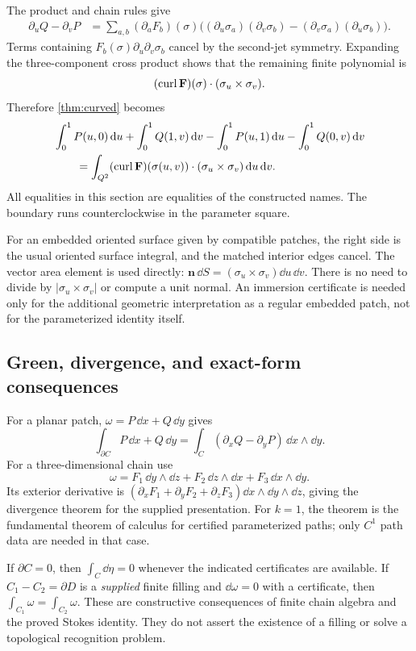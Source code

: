 The product and chain rules give
\begin{align*}
 \partial_uQ-\partial_vP
 &=\sum_{a,b}(\partial_aF_b)(\sigma)
       \bigl((\partial_u\sigma_a)(\partial_v\sigma_b)
             -(\partial_v\sigma_a)(\partial_u\sigma_b)\bigr).
\end{align*}
Terms containing $F_b(\sigma)\partial_u\partial_v\sigma_b$ cancel
by the second-jet symmetry. Expanding the three-component cross
product shows that the remaining finite polynomial is
\[
 (\operatorname{curl}\mathbf F)(\sigma)\cdot(\sigma_u\times\sigma_v).
\]
Therefore \cref{thm:curved} becomes
\begin{align}
 &\int_0^1P(u,0)\,\mathrm d u+\int_0^1Q(1,v)\,\mathrm d v
       -\int_0^1P(u,1)\,\mathrm d u-\int_0^1Q(0,v)\,\mathrm d v\notag\\
 &\hspace{2em}=
 \int_{Q^2}(\operatorname{curl}\mathbf F)(\sigma(u,v))
                       \cdot(\sigma_u\times\sigma_v)\,\mathrm d u\,\mathrm d v .
 \label{eq:kelvin-explicit}
\end{align}
All equalities in this section are equalities of the constructed names.
The boundary runs counterclockwise in the parameter square.

For an embedded oriented surface given by compatible patches, the right
side is the usual oriented surface integral, and the matched interior
edges cancel. The vector area element is used directly:
$\mathbf n\,\dd S=(\sigma_u\times\sigma_v)\dd u\,\dd v$.
There is no need to divide by $|\sigma_u\times\sigma_v|$ or compute a unit
normal. An immersion certificate is needed only for the additional
geometric interpretation as a regular embedded patch, not for the
parameterized identity itself.

\subsection{Green, divergence, and exact-form consequences}

For a planar patch, $\omega=P\,\dd x+Q\,\dd y$ gives
\[
 \int_{\partial C}P\,\dd x+Q\,\dd y
   =\int_C(\partial_xQ-\partial_yP)\,\dd x\wedge\dd y.
\]
For a three-dimensional chain use
\[
 \omega=F_1\,\dd y\wedge\dd z
       +F_2\,\dd z\wedge\dd x+F_3\,\dd x\wedge\dd y.
\]
Its exterior derivative is
$(\partial_xF_1+\partial_yF_2+\partial_zF_3)\dd x\wedge\dd y\wedge\dd z$,
giving the divergence theorem for the supplied presentation.
For $k=1$, the theorem is the fundamental theorem of calculus for
certified parameterized paths; only $C^1$ path data are needed in that
case.

If $\partial C=0$, then $\int_C\dd\eta=0$ whenever the indicated
certificates are available. If $C_1-C_2=\partial D$ is a \emph{supplied}
finite filling and $\dd\omega=0$ with a certificate, then
$\int_{C_1}\omega=\int_{C_2}\omega$.
These are constructive consequences of finite chain algebra and the
proved Stokes identity. They do not assert the existence of a filling
or solve a topological recognition problem.
